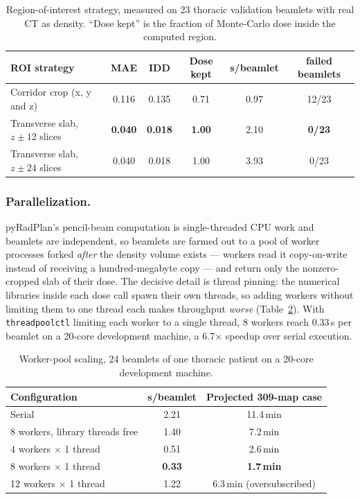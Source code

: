 \documentclass[runningheads]{llncs}
\begin{document}
\begin{table}[t]
\centering
\caption{Region-of-interest strategy, measured on 23 thoracic validation beamlets with real CT as density. ``Dose kept'' is the fraction of Monte-Carlo dose inside the computed region.}
\label{tab:slab}
\begin{tabular}{lccccc}
\toprule
ROI strategy & MAE & IDD & Dose kept & s/beamlet & failed beamlets\\
\midrule
Corridor crop (x, y and z) & 0.116 & 0.135 & 0.71 & 0.97 & 12/23\\
Transverse slab, $z\pm12$ slices & \textbf{0.040} & \textbf{0.018} & \textbf{1.00} & 2.10 & \textbf{0/23}\\
Transverse slab, $z\pm24$ slices & 0.040 & 0.018 & 1.00 & 3.93 & 0/23\\
\bottomrule
\end{tabular}
\end{table}

\subsubsection{Parallelization.}
pyRadPlan's pencil-beam computation is single-threaded CPU work and beamlets are independent, so beamlets are farmed out to a pool of worker processes forked \emph{after} the density volume exists --- workers read it copy-on-write instead of receiving a hundred-megabyte copy --- and return only the nonzero-cropped slab of their dose. The decisive detail is thread pinning: the numerical libraries inside each dose call spawn their own threads, so adding workers without limiting them to one thread each makes throughput \emph{worse} (Table~\ref{tab:parallel}). With \texttt{threadpoolctl} limiting each worker to a single thread, 8 workers reach 0.33\,s per beamlet on a 20-core development machine, a 6.7$\times$ speedup over serial execution.

\begin{table}[t]
\centering
\caption{Worker-pool scaling, 24 beamlets of one thoracic patient on a 20-core development machine.}
\label{tab:parallel}
\begin{tabular}{lcc}
\toprule
Configuration & s/beamlet & Projected 309-map case\\
\midrule
Serial & 2.21 & 11.4\,min\\
8 workers, library threads free & 1.40 & 7.2\,min\\
4 workers $\times$ 1 thread & 0.51 & 2.6\,min\\
8 workers $\times$ 1 thread & \textbf{0.33} & \textbf{1.7\,min}\\
12 workers $\times$ 1 thread & 1.22 & 6.3\,min (oversubscribed)\\
\bottomrule
\end{tabular}
\end{table}
\end{document}
